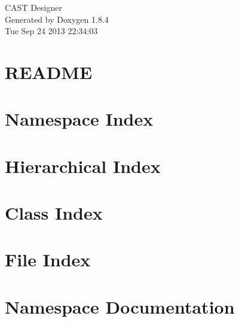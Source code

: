 \documentclass[twoside]{book}
\newcommand{\clearemptydoublepage}{%
  \newpage{\pagestyle{empty}\cleardoublepage}%
}
\begin{document}
\hypersetup{pageanchor=false}
\begin{titlepage}
\vspace*{7cm}
\begin{center}%
{\Large C\-A\-S\-T Designer }\\
\vspace*{1cm}
{\large Generated by Doxygen 1.8.4}\\
\vspace*{0.5cm}
{\small Tue Sep 24 2013 22:34:03}\\
\end{center}
\end{titlepage}
\clearemptydoublepage
\tableofcontents
\clearemptydoublepage
{}
\hypersetup{pageanchor=true}

\chapter{R\-E\-A\-D\-M\-E}
\label{md_README}
\hypertarget{md_README}{}

\chapter{Namespace Index}

\chapter{Hierarchical Index}

\chapter{Class Index}

\chapter{File Index}

\chapter{Namespace Documentation}




























\end{document}
